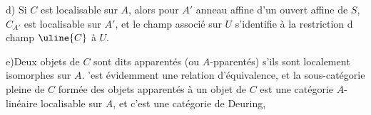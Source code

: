 d)\quad {} Si $C$ est localisable sur $A$, alors pour $A'$  anneau affine d'un ouvert affine  de $S$, $C_{A'}$ est localisable sur $A'$, et le champ associé sur $U$ s'identifie à la restriction d champ $\uline{C}$ à $U$.

e)\quad Deux objets de $C$ sont dits apparentés (ou $A$-pparentés) s'ils sont localement isomorphes sur $A$. 'est évidemment une relation d'équivalence, et la sous-catégorie pleine de $C$ formée des objets apparentés à un objet de $C$ est une catégorie  $A$-linéaire localisable sur $A$, et c'est une catégorie de Deuring,

